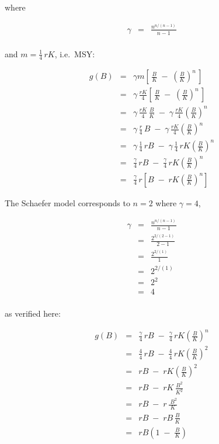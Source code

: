 \documentclass[fleqn]{article}
\begin{document}
where

\begin{eqnarray*}
  \gamma &=& \frac{n^{n/(n-1)}}{n-1}\\[1ex]
\end{eqnarray*}

and $m\!=\!\frac{1}{4}\,rK$, i.e.\ MSY:

\begin{eqnarray*}
  g(B) &=& \gamma m\left[\,\frac{B}{K} \;-\;
    \left(\frac{B}{K}\right)^{\!\!n}\,\right]              \\[1em]
  ~    &=& \gamma\,\frac{rK}{4}\left[\,\frac{B}{K} \;-\;
    \left(\frac{B}{K}\right)^{\!\!n}\,\right]              \\[1em]
  ~    &=& \gamma\,\frac{rK}{4}\,\frac{B}{K} \;-\;
  \gamma\,\frac{rK}{4}\!\left(\frac{B}{K}\right)^{\!\!n}   \\[1em]
  ~    &=& \gamma\,\frac{r}{4}\,B \;-\;
  \gamma\,\frac{rK}{4}\!\left(\frac{B}{K}\right)^{\!\!n}   \\[1em]
  ~    &=& \gamma\,\frac{1}{4}\,rB \;-\;
  \gamma\,\frac{1}{4}\,rK\!\left(\frac{B}{K}\right)^{\!\!n}\\[1em]
  ~    &=& \frac{\gamma}{4}\,rB \;-\;
  \frac{\gamma}{4}\,rK\!\left(\frac{B}{K}\right)^{\!\!n}   \\[1em]
  ~    &=& \frac{\gamma}{4}\,r\left[B \;-\;
    rK\!\left(\frac{B}{K}\right)^{\!\!n}\right]
\end{eqnarray*}

\newpage

The Schaefer model corresponds to $n\!=\!2$ where $\gamma\!=\!4$,

\begin{eqnarray*}
  \gamma &=& \frac{n^{n/(n-1)}}{n-1}\\[1em]
  ~      &=& \frac{2^{2/(2-1)}}{2-1}\\[1em]
  ~      &=& \frac{2^{2/(1)}}{1}    \\[1em]
  ~      &=& 2^{2/(1)}              \\[1em]
  ~      &=& 2^2                    \\[1em]
  ~      &=& 4                      \\[1ex]
\end{eqnarray*}

as verified here:

\begin{eqnarray*}
  g(B) &=& \frac{\gamma}{4}\,rB \;-\;
  \frac{\gamma}{4}\,rK\!\left(\frac{B}{K}\right)^{\!\!n}\\[1em]
  ~    &=& \frac{4}{4}\,rB \;-\;
  \frac{4}{4}\,rK\!\left(\frac{B}{K}\right)^{\!2}       \\[1em]
  ~    &=& rB \;-\; rK\!\left(\frac{B}{K}\right)^{\!2}  \\[1em]
  ~    &=& rB \;-\; rK\,\frac{B^2}{K^2}                 \\[1em]
  ~    &=& rB \;-\; r\,\frac{\;B^2}{K}                  \\[1em]
  ~    &=& rB \;-\; rB\,\frac{B}{K}                     \\[1em]
  ~    &=& rB\left(1 \;-\; \frac{B}{K}\right)
\end{eqnarray*}
\end{document}
